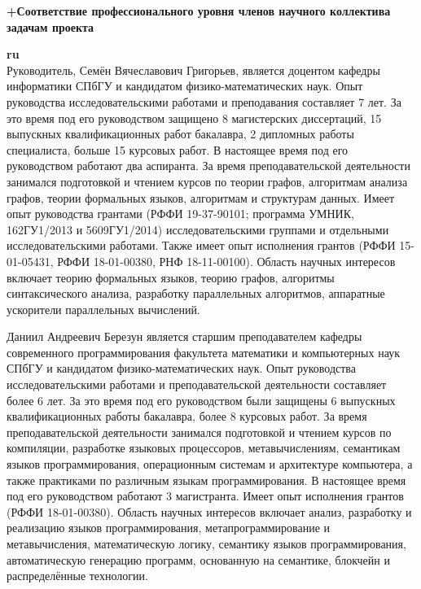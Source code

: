 \documentclass[12pt]{article}  %
\theoremstyle{remark}
\begin{document}
\textbf{+Соответствие профессионального уровня членов научного коллектива задачам проекта}

\textbf{ru}\\
%
Руководитель, Семён Вячеславович Григорьев, является доцентом кафедры информатики СПбГУ и кандидатом физико-математических наук. Опыт руководства исследовательскими работами и преподавания составляет 7 лет. За это время под его руководством защищено 8 магистерских диссертаций, 15 выпускных квалификационных работ бакалавра, 2 дипломных работы специалиста, больше 15 курсовых работ. В настоящее время под его руководством работают два аспиранта. За время преподавательской деятельности занимался подготовкой и чтением курсов по теории графов, алгоритмам анализа графов, теории формальных языков, алгоритмам и структурам данных. Имеет опыт руководства грантами (РФФИ 19-37-90101; программа УМНИК, 162ГУ1/2013 и 5609ГУ1/2014) исследовательскими группами и отдельными исследовательскими работами. Также имеет опыт исполнения грантов (РФФИ 15-01-05431, РФФИ 18-01-00380, РНФ 18-11-00100). Область научных интересов включает теорию формальных языков, теорию графов, алгоритмы синтаксического анализа, разработку параллельных алгоритмов, аппаратные ускорители параллельных вычислений.

Даниил Андреевич Березун является старшим преподавателем кафедры современного программирования факультета математики и компьютерных наук СПбГУ и кандидатом физико-математических наук. Опыт руководства исследовательскими работами и преподавательской деятельности составляет более 6 лет. За это время под его руководством были защищены 6 выпускных квалификационных работы бакалавра, более 8 курсовых работ. За время преподавательской деятельности занимался подготовкой и чтением курсов по компиляции, разработке языковых процессоров, метавычислениям, семантикам языков программирования, операционным системам и архитектуре компьютера, а также практиками по различным языкам программирования. В настоящее время под его руководством работают 3 магистранта. Имеет опыт исполнения грантов (РФФИ 18-01-00380). Область научных интересов включает анализ, разработку и реализацию языков программирования,  метапрограммирование и метавычисления, математическую логику, семантику языков программирования, автоматическую генерацию программ, основанную на семантике, блокчейн и распределённые технологии.
\end{document}
